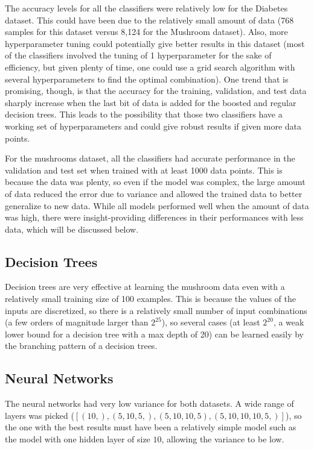 \documentclass[11pt]{article}
\begin{document}
        The accuracy levels for all the classifiers were relatively low for the Diabetes dataset. This could have been due to the relatively small amount of data (768 samples for this dataset versus 8,124 for the Mushroom dataset). Also, more hyperparameter tuning could potentially give better results in this dataset (most of the classifiers involved the tuning of 1 hyperparameter for the sake of efficiency, but given plenty of time, one could use a grid search algorithm with several hyperparameters to find the optimal combination). One trend that is promising, though, is that the accuracy for the training, validation, and test data sharply increase when the last bit of data is added for the boosted and regular decision trees. This leads to the possibility that those two classifiers have a working set of hyperparameters and could give robust results if given more data points.

        For the mushrooms dataset, all the classifiers had accurate performance in the validation and test set when trained with at least 1000 data points. This is because the data was plenty, so even if the model was complex, the large amount of data reduced the error due to variance and allowed the trained data to better generalize to new data. While all models performed well when the amount of data was high, there were insight-providing differences in their performances with less data, which will be discussed below.


        \subsection{Decision Trees}


        Decision trees are very effective at learning the mushroom data even with a relatively
        small training size of 100 examples. This is because the values of the inputs
        are discretized, so there is a relatively small number of input combinations (a few orders
        of magnitude larger than $2^{25}$), so several cases (at least $2^{20}$, a weak lower bound for a decision tree with a max depth of 20) can be learned easily by the branching
        pattern of a decision trees.

        \subsection{Neural Networks}

        The neural networks had very low variance for both datasets.
        A wide range of layers was picked ($[(10,), (5, 10, 5,), (5, 10, 10, 5), (5, 10, 10, 10, 5,)]$),
        so the one with the best results must have been a relatively simple model such as
        the model with one hidden layer of size $10$, allowing the variance to be low.
\end{document}
